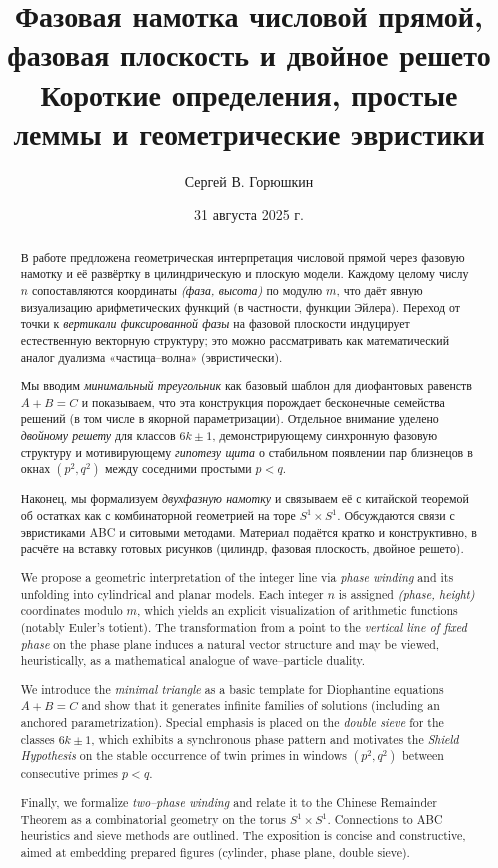 \documentclass[12pt,a4paper]{article}
\title{\textbf{Фазовая намотка числовой прямой, фазовая плоскость и двойное решето}\\[2mm]
\large Короткие определения, простые леммы и геометрические эвристики}
\author{Сергей В. Горюшкин}
\date{31 августа 2025 г.}
\theoremstyle{definition}
\theoremstyle{plain}
\theoremstyle{remark}
\begin{document}
\maketitle

\begin{abstract}
В работе предложена геометрическая интерпретация числовой прямой через
фазовую намотку и её развёртку в цилиндрическую и плоскую модели. Каждому
целому числу $n$ сопоставляются координаты \emph{(фаза, высота)} по модулю $m$,
что даёт явную визуализацию арифметических функций (в частности, функции Эйлера).
Переход от точки к \emph{вертикали фиксированной фазы} на фазовой плоскости индуцирует естественную
векторную структуру; это можно рассматривать как математический аналог дуализма
«частица–волна» (эвристически).

Мы вводим \emph{минимальный треугольник} как базовый шаблон для диофантовых равенств
$A+B=C$ и показываем, что эта конструкция порождает бесконечные семейства решений
(в том числе в якорной параметризации). Отдельное внимание уделено \emph{двойному решету}
для классов $6k\pm1$, демонстрирующему синхронную фазовую структуру и мотивирующему
\emph{гипотезу щита} о стабильном появлении пар близнецов в окнах $(p^2,q^2)$ между
соседними простыми $p<q$.

Наконец, мы формализуем \emph{двухфазную намотку} и связываем её с китайской теоремой
об остатках как с комбинаторной геометрией на торе $S^1\times S^1$. Обсуждаются
связи с эвристиками ABC и ситовыми методами. Материал подаётся кратко и конструктивно,
в расчёте на вставку готовых рисунков (цилиндр, фазовая плоскость, двойное решето).
\end{abstract}

\begin{abstract}
We propose a geometric interpretation of the integer line via \emph{phase winding}
and its unfolding into cylindrical and planar models. Each integer $n$ is assigned
\emph{(phase, height)} coordinates modulo $m$, which yields an explicit visualization
of arithmetic functions (notably Euler's totient). The transformation from a point
to the \emph{vertical line of fixed phase} on the phase plane induces a natural vector structure and may
be viewed, heuristically, as a mathematical analogue of wave–particle duality.

We introduce the \emph{minimal triangle} as a basic template for Diophantine equations
$A+B=C$ and show that it generates infinite families of solutions (including an anchored
parametrization). Special emphasis is placed on the \emph{double sieve} for the classes
$6k\pm1$, which exhibits a synchronous phase pattern and motivates the \emph{Shield
Hypothesis} on the stable occurrence of twin primes in windows $(p^2,q^2)$ between
consecutive primes $p<q$.

Finally, we formalize \emph{two–phase winding} and relate it to the Chinese Remainder
Theorem as a combinatorial geometry on the torus $S^1\times S^1$. Connections to ABC
heuristics and sieve methods are outlined. The exposition is concise and constructive,
aimed at embedding prepared figures (cylinder, phase plane, double sieve).
\end{abstract}
\end{document}
